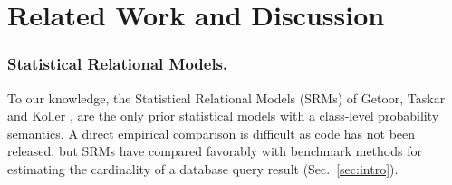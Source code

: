 \documentclass[oribibl]{llncs}
\begin{document}
\section{Related Work and Discussion} \label{sec:related}

%

%




\subsubsection{Statistical Relational Models.}  To our knowledge, the Statistical Relational Models (SRMs) of Getoor, Taskar and Koller \cite{Getoor2001a}, are the only prior statistical models with a class-level probability semantics. A direct empirical comparison is difficult as code has not been released, but
SRMs have compared favorably with benchmark methods for estimating the cardinality of a database query result \cite{Getoor2001} (Sec.~\ref{sec:intro}).
\end{document}

